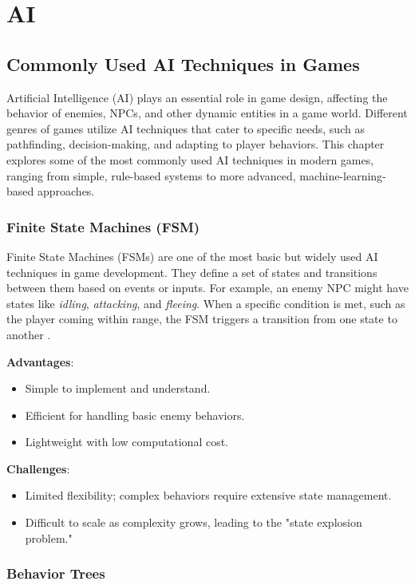 \section{AI}
\subsection{Commonly Used AI Techniques in Games}

Artificial Intelligence (AI) plays an essential role in game design,
affecting the behavior of enemies, NPCs, and other dynamic entities in a game world.
Different genres of games utilize AI techniques that cater to specific needs,
such as pathfinding, decision-making, and adapting to player behaviors.
This chapter explores some of the most commonly used AI techniques in modern games,
ranging from simple, rule-based systems to more advanced,
machine-learning-based approaches.

\subsubsection{Finite State Machines (FSM)}

Finite State Machines (FSMs) are one of the most basic but widely used AI techniques in game development.
They define a set of states and transitions between them based on events or inputs.
For example, an enemy NPC might have states like \textit{idling}, \textit{attacking},
and \textit{fleeing}. When a specific condition is met,
such as the player coming within range,
the FSM triggers a transition from one state to another \cite{Mike_2020}.

\textbf{Advantages}:
\begin{itemize}
    \item Simple to implement and understand.
    \item Efficient for handling basic enemy behaviors.
    \item Lightweight with low computational cost.
\end{itemize}

\textbf{Challenges}:
\begin{itemize}
    \item Limited flexibility; complex behaviors require extensive state management.
    \item Difficult to scale as complexity grows, leading to the "state explosion problem." \end{itemize}

\subsubsection{Behavior Trees}

